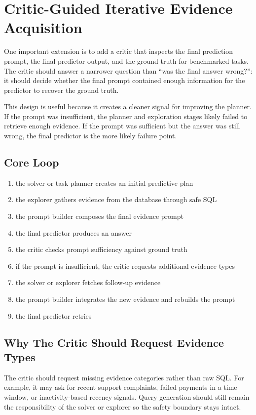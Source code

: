 \documentclass[11pt]{book}
\begin{document}
\section{Critic-Guided Iterative Evidence Acquisition}
One important extension is to add a critic that inspects the final prediction prompt, the final
predictor output, and the ground truth for benchmarked tasks. The critic should answer a narrower
question than ``was the final answer wrong?'': it should decide whether the final prompt contained
enough information for the predictor to recover the ground truth.

This design is useful because it creates a cleaner signal for improving the planner. If the prompt
was insufficient, the planner and exploration stages likely failed to retrieve enough evidence. If
the prompt was sufficient but the answer was still wrong, the final predictor is the more likely
failure point.

\subsection*{Core Loop}
\begin{enumerate}
\item the solver or task planner creates an initial predictive plan
\item the explorer gathers evidence from the database through safe SQL
\item the prompt builder composes the final evidence prompt
\item the final predictor produces an answer
\item the critic checks prompt sufficiency against ground truth
\item if the prompt is insufficient, the critic requests additional evidence types
\item the solver or explorer fetches follow-up evidence
\item the prompt builder integrates the new evidence and rebuilds the prompt
\item the final predictor retries
\end{enumerate}

\subsection*{Why The Critic Should Request Evidence Types}
The critic should request missing evidence categories rather than raw SQL. For example, it may ask
for recent support complaints, failed payments in a time window, or inactivity-based recency
signals. Query generation should still remain the responsibility of the solver or explorer so the
safety boundary stays intact.
\end{document}
